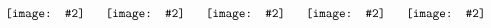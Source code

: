 \newcommand{\xlogo}[2]{\raisebox{-0.5\height}{~\texttt{[image: \#2]}}~}  %
\begin{equation*}
\begin{array}{ccccccc}
  \xlogo{2.4}{cihr}  &
  \xlogo{2.4}{nserc} &
  \xlogo{1.7}{map}   &
  \xlogo{2.2}{smh}   &
  \xlogo{2.4}{uoft}
\end{array}
\end{equation*}

